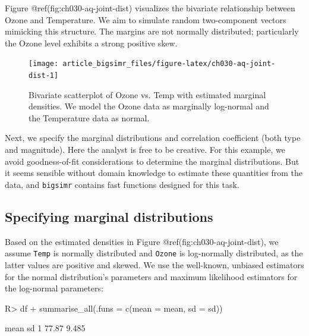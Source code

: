 \documentclass[
]{jss}
\begin{document}
Figure @ref(fig:ch030-aq-joint-dist) visualizes the bivariate
relationship between Ozone and Temperature. We aim to simulate random
two-component vectors mimicking this structure. The margins are not
normally distributed; particularly the Ozone level exhibits a strong
positive skew.

\begin{CodeChunk}
\begin{figure}

{\centering \texttt{[image: article\_bigsimr\_files/figure-latex/ch030-aq-joint-dist-1]} 

}

\caption[Bivariate scatterplot of Ozone vs]{Bivariate scatterplot of Ozone vs. Temp with estimated marginal densities. We model the Ozone data as marginally log-normal and the Temperature data as normal.}\label{fig:ch030-aq-joint-dist}
\end{figure}
\end{CodeChunk}

Next, we specify the marginal distributions and correlation coefficient
(both type and magnitude). Here the analyst is free to be creative. For
this example, we avoid goodness-of-fit considerations to determine the
marginal distributions. But it seems sensible without domain knowledge
to estimate these quantities from the data, and \texttt{bigsimr}
contains fast functions designed for this task.

\hypertarget{specifying-marginal-distributions}{%
\subsection{Specifying marginal
distributions}\label{specifying-marginal-distributions}}

Based on the estimated densities in Figure
@ref(fig:ch030-aq-joint-dist), we assume \texttt{Temp} is normally
distributed and \texttt{Ozone} is log-normally distributed, as the
latter values are positive and skewed. We use the well-known, unbiased
estimators for the normal distribution's parameters and maximum
likelihood estimators for the log-normal parameters:

\begin{CodeChunk}
\begin{CodeInput}
R> df %
+   summarise_all(.funs = c(mean = mean, sd = sd))
\end{CodeInput}
\begin{CodeOutput}
   mean    sd
1 77.87 9.485
\end{CodeOutput}
\end{CodeChunk}
\end{document}
